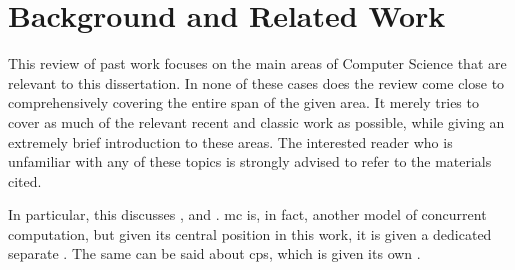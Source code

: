\chapter{\label{chap:lr}Background and Related Work}
This review of past work focuses on the main areas of Computer Science that are relevant to this dissertation.  In none of these cases does the review come close to comprehensively covering the entire span of the given area.  It merely tries to cover as much of the relevant recent and classic work as possible, while giving an extremely brief introduction to these areas.  The interested reader who is unfamiliar with any of these topics is strongly advised to refer to the materials cited.


In particular, this  discusses ,  and .  \Gls{mc} is, in fact, another model of concurrent computation, but given its central position in this work, it is given a dedicated separate .  The same can be said about \gls{cps}, which is given its own .



